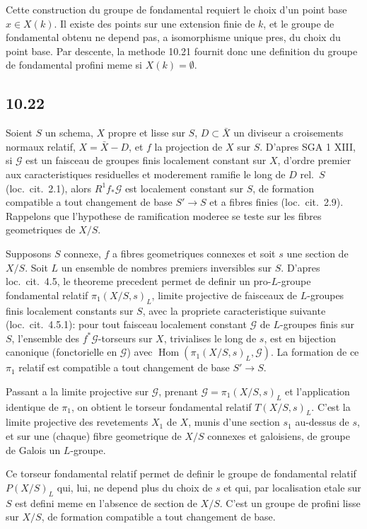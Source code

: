 \documentclass[12pt,a4paper]{article}
\theoremstyle{plain}
\theoremstyle{definition}
\theoremstyle{remark}
\DeclareMathOperator{\Hom}{Hom}
\begin{document}
Cette construction du groupe de fondamental requiert le choix d'un point base $x \in X(k)$. Il existe des points sur une extension finie de $k$, et le groupe de fondamental obtenu ne depend pas, a isomorphisme unique pres, du choix du point base. Par descente, la methode 10.21 fournit donc une definition du groupe de fondamental profini meme si $X(k) = \emptyset$.


\subsection*{10.22}

Soient $S$ un schema, $X$ propre et lisse sur $S$, $D \subset \bar{X}$ un diviseur a croisements normaux relatif, $X = \bar{X} - D$, et $f$ la projection de $X$ sur $S$. D'apres SGA 1 XIII, si $\mathcal{G}$ est un faisceau de groupes finis localement constant sur $X$, d'ordre premier aux caracteristiques residuelles et moderement ramifie le long de $D$ rel.~$S$ (loc.~cit.~2.1), alors $R^1 f_* \mathcal{G}$ est localement constant sur $S$, de formation compatible a tout changement de base $S' \to S$ et a fibres finies (loc.~cit.~2.9). Rappelons que l'hypothese de ramification moderee se teste sur les fibres geometriques de $X/S$.

Supposons $S$ connexe, $f$ a fibres geometriques connexes et soit $s$ une section de $X/S$. Soit $L$ un ensemble de nombres premiers inversibles sur $S$. D'apres loc.~cit.~4.5, le theoreme precedent permet de definir un pro-$L$-groupe fondamental relatif $\pi_1(X/S, s)_L$, limite projective de faisceaux de $L$-groupes finis localement constants sur $S$, avec la propriete caracteristique suivante (loc.~cit.~4.5.1): pour tout faisceau localement constant $\mathcal{G}$ de $L$-groupes finis sur $S$, l'ensemble des $f^*\mathcal{G}$-torseurs sur $X$, trivialises le long de $s$, est en bijection canonique (fonctorielle en $\mathcal{G}$) avec $\Hom(\pi_1(X/S, s)_L, \mathcal{G})$. La formation de ce $\pi_1$ relatif est compatible a tout changement de base $S' \to S$.

Passant a la limite projective sur $\mathcal{G}$, prenant $\mathcal{G} = \pi_1(X/S, s)_L$ et l'application identique de $\pi_1$, on obtient le torseur fondamental relatif $T(X/S, s)_L$. C'est la limite projective des revetements $X_1$ de $X$, munis d'une section $s_1$ au-dessus de $s$, et sur une (chaque) fibre geometrique de $X/S$ connexes et galoisiens, de groupe de Galois un $L$-groupe.

Ce torseur fondamental relatif permet de definir le groupe de fondamental relatif $P(X/S)_L$ qui, lui, ne depend plus du choix de $s$ et qui, par localisation etale sur $S$ est defini meme en l'absence de section de $X/S$. C'est un groupe de profini lisse sur $X/S$, de formation compatible a tout changement de base.
\end{document}

